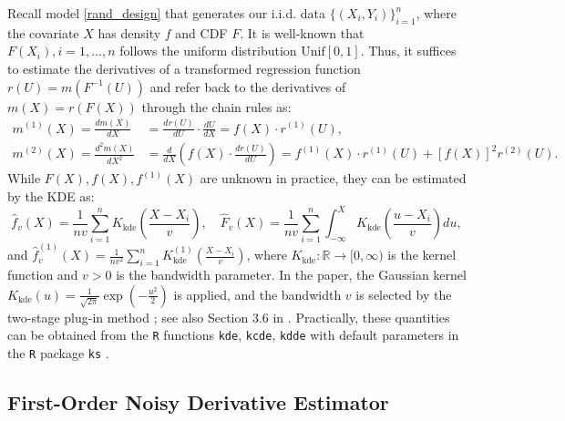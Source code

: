 \documentclass{uwstat572}
\theoremstyle{definition}
\renewcommand{\hat}{\widehat}
\theoremstyle{theorem}
\begin{document}
Recall model \eqref{rand_design} that generates our i.i.d. data $\{(X_i,Y_i)\}_{i=1}^n$, where the covariate $X$ has density $f$ and CDF $F$. It is well-known \citep{casella2002statistical} that $F(X_i), i=1,...,n$ follows the uniform distribution $\mathrm{Unif}[0,1]$. Thus, it suffices to estimate the derivatives of a transformed regression function $r(U) = m(F^{-1}(U))$ and refer back to the derivatives of $m(X) = r(F(X))$ through the chain rules as:
\begin{equation}
\label{back_transform}
\begin{split}
m^{(1)}(X)=\frac{d m(X)}{dX} &= \frac{d r(U)}{dU} \cdot \frac{dU}{d X} = f(X) \cdot r^{(1)}(U),\\
m^{(2)}(X)=\frac{d^2 m(X)}{dX^2} &= \frac{d}{dX}\left(f(X) \cdot \frac{dr(U)}{dU} \right) = f^{(1)}(X) \cdot r^{(1)}(U) + \left[f(X)\right]^2 r^{(2)}(U).
\end{split}
\end{equation}
While $F(X),f(X),f^{(1)}(X)$ are unknown in practice, they can be estimated by the KDE as:
\begin{equation}
\label{KDE}
\hat{f}_v(X)=\frac{1}{nv} \sum_{i=1}^n K_{\text{kde}}\left(\frac{X-X_i}{v}\right), \quad \hat{F}_v(X) = \frac{1}{nv} \sum_{i=1}^n \int_{-\infty}^X K_{\text{kde}}\left(\frac{u-X_i}{v}\right) du,
\end{equation} 
and $\hat{f}_v^{(1)}(X) = \frac{1}{nv^2} \sum\limits_{i=1}^n K_{\text{kde}}^{(1)}\left(\frac{X-X_i}{v}\right)$, where $K_{\text{kde}}:\mathbb{R}\to [0,\infty)$ is the kernel function and $v>0$ is the bandwidth parameter. In the paper, the Gaussian kernel $K_{\text{kde}}(u)=\frac{1}{\sqrt{2\pi}} \exp\left(-\frac{u^2}{2}\right)$ is applied, and the bandwidth $v$ is selected by the two-stage plug-in method \citep{sheather1991reliable}; see also Section 3.6 in \cite{wand1994kernel}. Practically, these quantities can be obtained from the \texttt{R} functions \texttt{kde}, \texttt{kcde}, \texttt{kdde} with default parameters in the \texttt{R} package \texttt{ks} \citep{ks2022R}.

\subsection{First-Order Noisy Derivative Estimator}
\end{document}
